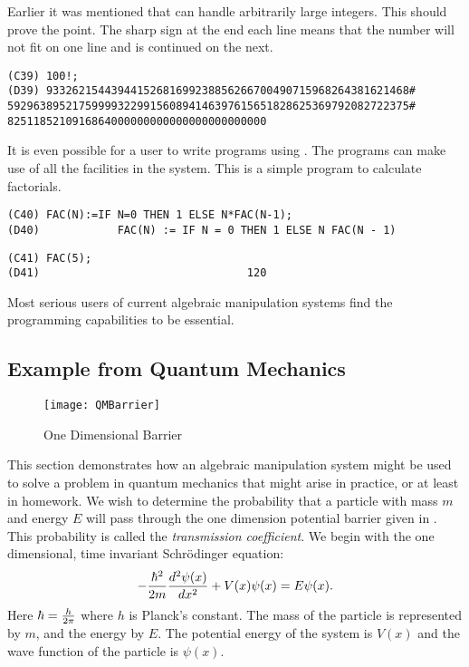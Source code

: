 Earlier it was mentioned that {\Macsyma} can handle arbitrarily large integers.
This should prove the point.  The sharp sign 
at the end each line means that
the number will not fit on one line and is continued on the next.
\begin{verbatim}
(C39) 100!;
(D39) 93326215443944152681699238856266700490715968264381621468#
59296389521759999322991560894146397615651828625369792082722375#
8251185210916864000000000000000000000000
\end{verbatim}
It is even possible for a user to write programs using {\Macsyma}.  The
programs can make use of all the facilities in the {\Macsyma} system.
This is a simple program to calculate factorials.
\begin{verbatim}
(C40) FAC(N):=IF N=0 THEN 1 ELSE N*FAC(N-1);
(D40)            FAC(N) := IF N = 0 THEN 1 ELSE N FAC(N - 1)
\end{verbatim}

\begin{verbatim}
(C41) FAC(5);
(D41)                                120
\end{verbatim}
Most serious users of current algebraic manipulation systems find the
programming capabilities to be essential.


\subsection{Example from Quantum Mechanics}
\label{Quantum:Ex:Sec}

\begin{figure}
\begin{center}
\texttt{[image: QMBarrier]}
\end{center}
\caption{One Dimensional Barrier\label{QMBarrier:Fig}}
\end{figure}

This section demonstrates how an algebraic manipulation system might
be used to solve a problem in quantum mechanics that might arise in
practice, or at least in homework.  We wish to determine the
probability that a particle with mass $m$ and energy $E$ will pass
through the one dimension potential barrier given in
.  This probability is called the {\em
transmission coefficient\/}.  We begin with the one dimensional, time
invariant Schr\"odinger equation:
\[
-{\hbar^2 \over 2 m} {d^2 \psi(x) \over dx^2} + V(x) \psi(x) = E
\psi(x).
\]
Here $\hbar = {h \over 2 \pi}$ where $h$ is Planck's constant.  The
mass of the particle is represented by $m$, and the energy by $E$.
The potential energy of the system is $V(x)$ and the wave function of
the particle is $\psi(x)$.

